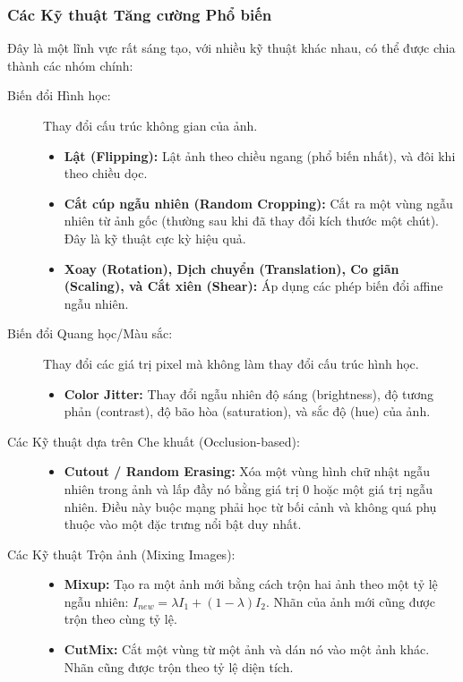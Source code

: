 \subsubsection{Các Kỹ thuật Tăng cường Phổ biến}
\label{subsubsec:augmentation_techniques}
Đây là một lĩnh vực rất sáng tạo, với nhiều kỹ thuật khác nhau, có thể được chia thành các nhóm chính:
\begin{description}
	\item[Biến đổi Hình học:] Thay đổi cấu trúc không gian của ảnh.
	\begin{itemize}
		\item \textbf{Lật (Flipping):} Lật ảnh theo chiều ngang (phổ biến nhất), và đôi khi theo chiều dọc.
		\item \textbf{Cắt cúp ngẫu nhiên (Random Cropping):} Cắt ra một vùng ngẫu nhiên từ ảnh gốc (thường sau khi đã thay đổi kích thước một chút). Đây là kỹ thuật cực kỳ hiệu quả.
		\item \textbf{Xoay (Rotation), Dịch chuyển (Translation), Co giãn (Scaling), và Cắt xiên (Shear):} Áp dụng các phép biến đổi affine ngẫu nhiên.
	\end{itemize}
	\item[Biến đổi Quang học/Màu sắc:] Thay đổi các giá trị pixel mà không làm thay đổi cấu trúc hình học.
	\begin{itemize}
		\item \textbf{Color Jitter:} Thay đổi ngẫu nhiên độ sáng (brightness), độ tương phản (contrast), độ bão hòa (saturation), và sắc độ (hue) của ảnh.
	\end{itemize}
	\item[Các Kỹ thuật dựa trên Che khuất (Occlusion-based):]
	\begin{itemize}
		\item \textbf{Cutout / Random Erasing:} Xóa một vùng hình chữ nhật ngẫu nhiên trong ảnh và lấp đầy nó bằng giá trị 0 hoặc một giá trị ngẫu nhiên. Điều này buộc mạng phải học từ bối cảnh và không quá phụ thuộc vào một đặc trưng nổi bật duy nhất.
	\end{itemize}
	\item[Các Kỹ thuật Trộn ảnh (Mixing Images):]
	\begin{itemize}
		\item \textbf{Mixup:} Tạo ra một ảnh mới bằng cách trộn hai ảnh theo một tỷ lệ ngẫu nhiên: $I_{new} = \lambda I_1 + (1-\lambda) I_2$. Nhãn của ảnh mới cũng được trộn theo cùng tỷ lệ.
		\item \textbf{CutMix:} Cắt một vùng từ một ảnh và dán nó vào một ảnh khác. Nhãn cũng được trộn theo tỷ lệ diện tích.
	\end{itemize}
\end{description}

